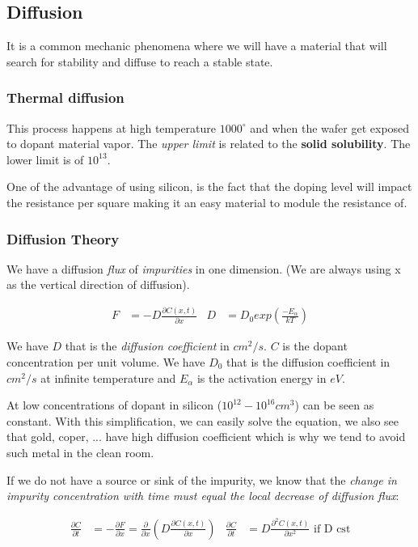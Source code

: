 \documentclass{report}
\begin{document}
\subsection{Diffusion}

It is a common mechanic phenomena where we will have a material that will search for stability and diffuse to reach a stable state.

\subsubsection{Thermal diffusion}

This process happens at high temperature $1000^\circ$ and when the wafer get exposed to dopant material vapor. The \textit{upper limit} is related to the \textbf{solid solubility}. The lower limit is of $10^{13}$. 

One of the advantage of using silicon, is the fact that the doping level will impact the resistance per square making it an easy material to module the resistance of.

\subsubsection{Diffusion Theory}

We have a diffusion \textit{flux} of \textit{impurities} in one dimension. (We are always using x as the vertical direction of diffusion).

\begin{align}
    F &= - D \frac{\partial C(x,t)}{\partial x} & D &= D_0 exp\left( \frac{-E_{\alpha}}{kT} \right)
\end{align}

We have $D$ that is the \textit{diffusion coefficient} in $cm^2/s$. $C$ is the dopant concentration per unit volume. We have $D_0$ that is the diffusion coefficient in $cm^2/s$ at infinite temperature and $E_\alpha$ is the activation energy in $eV$.

At low concentrations of dopant in silicon ($10^{12} - 10^{16} cm^3$) can be seen as constant. With this simplification, we can easily solve the equation, we also see that gold, coper, ... have high diffusion coefficient which is why we tend to avoid such metal in the clean room.

If we do not have a source or sink of the impurity, we know that the \textit{change in impurity concentration with time must equal the local decrease of diffusion flux}:

\begin{align}
    \frac{\partial C}{\partial t} &= - \frac{\partial F}{\partial x} = \frac{\partial}{\partial x} \left( D\frac{\partial C(x,t)}{\partial x} \right) & \frac{\partial C}{\partial t} &=  D\frac{\partial^2 C(x,t)}{\partial x^2} \text{ if D cst}
\end{align}
\end{document}
